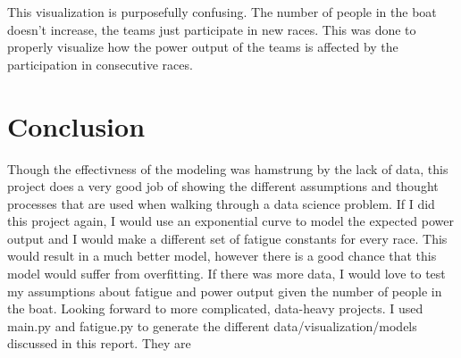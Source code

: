 \documentclass[12pt]{article} %
\begin{document}
This visualization is purposefully confusing. The number of people in the boat doesn't increase, the teams just participate in new races. This was done to properly visualize how the power output of the teams is affected by the participation in consecutive races.

\section*{Conclusion}
Though the effectivness of the modeling was hamstrung by the lack of data, this project does a very good job of showing the different assumptions and thought processes that are used when walking through a data science problem. If I did this project again, I would use an exponential curve to model the expected power output and I would make a different set of fatigue constants for every race. This would result in a much better model, however there is a good chance that this model would suffer from overfitting. If there was more data, I would love to test my assumptions about fatigue and power output given the number of people in the boat. Looking forward to more complicated, data-heavy projects. I used main.py and fatigue.py to generate the different data/visualization/models discussed in this report. They are  
\end{document}
